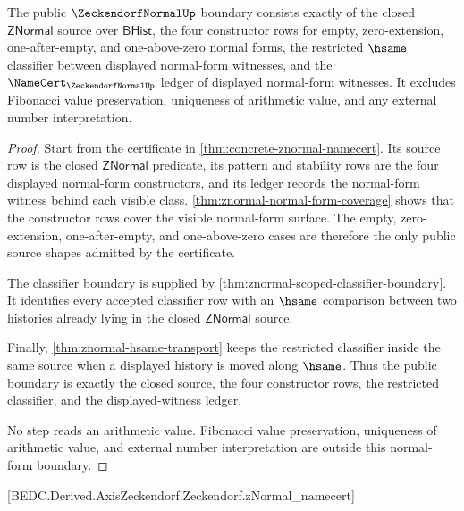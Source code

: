\begin{theorem}
\label{thm:znormal-public-normal-form-boundary}
The public $\ZeckendorfNormalUp$ boundary consists exactly of the closed
$\mathsf{ZNormal}$ source over $\mathsf{BHist}$, the four constructor rows
for empty, zero-extension, one-after-empty, and one-above-zero normal forms,
the restricted $\hsame$ classifier between displayed normal-form witnesses,
and the $\NameCert_{\ZeckendorfNormalUp}$ ledger of displayed normal-form
witnesses. It excludes Fibonacci value preservation, uniqueness of arithmetic
value, and any external number interpretation.
\end{theorem}
\begin{proof}
Start from the certificate in \autoref{thm:concrete-znormal-namecert}. Its
source row is the closed $\mathsf{ZNormal}$ predicate, its pattern and
stability rows are the four displayed normal-form constructors, and its ledger
records the normal-form witness behind each visible class.
\autoref{thm:znormal-normal-form-coverage} shows that the constructor rows
cover the visible normal-form surface. The empty, zero-extension,
one-after-empty, and one-above-zero cases are therefore the only public source
shapes admitted by the certificate.

The classifier boundary is supplied by
\autoref{thm:znormal-scoped-classifier-boundary}. It identifies every accepted
classifier row with an $\hsame$ comparison between two histories already lying
in the closed $\mathsf{ZNormal}$ source.

Finally, \autoref{thm:znormal-hsame-transport} keeps the restricted classifier
inside the same source when a displayed history is moved along $\hsame$. Thus
the public boundary is exactly the closed source, the four constructor rows,
the restricted classifier, and the displayed-witness ledger.

No step reads an arithmetic value. Fibonacci value preservation, uniqueness of
arithmetic value, and external number interpretation are outside this
normal-form boundary.
\end{proof}

[BEDC.Derived.AxisZeckendorf.Zeckendorf.zNormal\_namecert]

